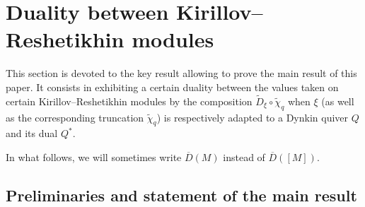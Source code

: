 \documentclass[12pt]{amsart}
\theoremstyle{plain}
\newtheorem{corollary}[theorem]{Corollary}
\theoremstyle{definition}
\numberwithin{equation}{section}
\newcommand{\tchi}{{\widetilde{\chi}}}
\newcommand{\tdxi}{\widetilde{D}_{\xi}}
\newcommand{\Ixi}{I^{\leq \xi}}
\newcommand{\barD}{\overline{D}}
\begin{document}



    
 \section{Duality between Kirillov--Reshetikhin modules}
  \label{sec : duality}

This section is devoted to the key result allowing to prove the main result of this paper. It consists in exhibiting a certain duality between the values taken  on certain Kirillov--Reshetikhin modules by the composition  $\tdxi \circ \tchi_q$ when $\xi$ (as well as the corresponding truncation $\tchi_q$) is respectively adapted to a Dynkin quiver $Q$ and its dual $Q^{*}$. 

In what follows, we will sometimes write $\barD(M)$ instead of $\barD([M])$. 

 \subsection{Preliminaries and statement of the main result}
  \label{sec : prelim and statement of duality}
\end{document}
